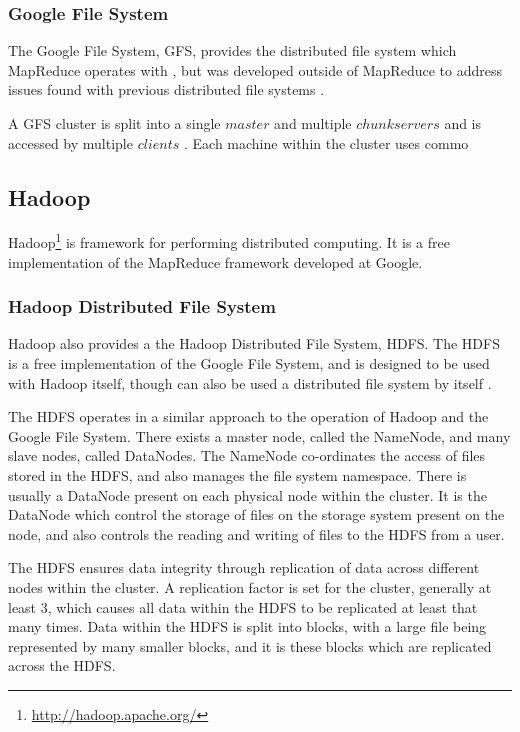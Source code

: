 \subsubsection{Google File System}
The Google File System, GFS, provides the distributed file system which MapReduce operates with \cite{mapreduce}, but was developed outside of MapReduce to address issues found with previous distributed file systems \cite{gfs}.

A GFS cluster is split into a single $master$ and multiple $chunkservers$ and is accessed by multiple $clients$ \cite{gfs}. Each machine within the cluster uses commo

\subsection{Hadoop}
Hadoop\footnote{\url{http://hadoop.apache.org/}} is framework for performing distributed computing. It is a free implementation of the MapReduce framework developed at Google.

\subsubsection{Hadoop Distributed File System}
Hadoop also provides a the Hadoop Distributed File System, HDFS. The HDFS is a free implementation of the Google File System, and is designed to be used with Hadoop itself, though can also be used a distributed file system by itself \cite{hdfs}.

The HDFS operates in a similar approach to the operation of Hadoop and the Google File System. There exists a master node, called the NameNode, and many slave nodes, called DataNodes. The NameNode co-ordinates the access of files stored in the HDFS, and also manages the file system namespace. There is usually a DataNode present on each physical node within the cluster. It is the DataNode which control the storage of files on the storage system present on the node, and also controls the reading and writing of files to the HDFS from a user.

The HDFS ensures data integrity through replication of data across different nodes within the cluster. A replication factor is set for the cluster, generally at least 3, which causes all data within the HDFS to be replicated at least that many times. Data within the HDFS is split into blocks, with a large file being represented by many smaller blocks, and it is these blocks which are replicated across the HDFS.

